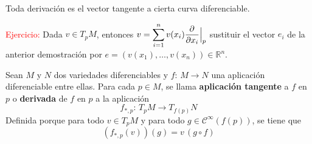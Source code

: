 \begin{cor}
Toda derivación es el vector tangente a cierta curva diferenciable.
\end{cor}
\begin{dem}
\textcolor{red}{Ejercicio:}
Dada $v \in T_pM$, entonces $v = \displaystyle \sum_{i=1}^n v(x_i) \dfrac{\partial^{} }{\partial x_i} \Big|_p$ sustituir el vector $e_i$ de la anterior demostración por $e = (v(x_1),\dots,v(x_n)) \in \mathbb{R}^n$.
\end{dem}

\begin{defi}
Sean $M$ y $N$ dos variedades diferenciables y $f:\,M \to N$ una aplicación diferenciable entre ellas. Para cada $p\in M$, se llama \textbf{aplicación tangente} a $f$ en $p$ o \textbf{derivada} de $f$ en $p$ a la aplicación $$f_{*,p}:\, T_pM \longrightarrow T_{f(p)}N$$
Definida porque para todo $v \in T_pM$ y para todo $g\in \mathcal{C}^{\infty}(f(p))$, se tiene que $$\left(f_{*,p}(v)\right)(g) = v\,(g\circ f)$$
\end{defi}

